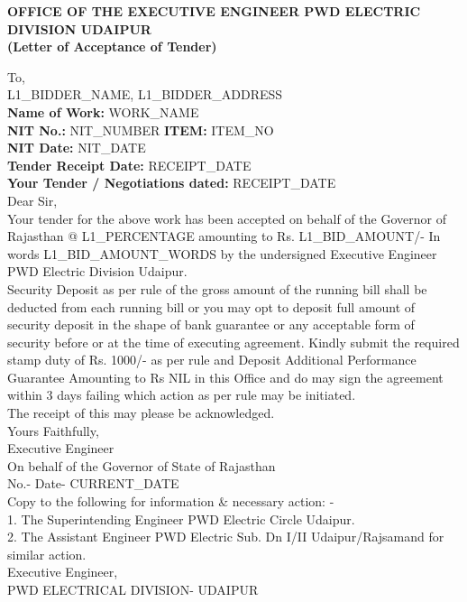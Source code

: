\documentclass[a4paper]{article}
\begin{document}
\begin{center}
    \textbf{OFFICE OF THE EXECUTIVE ENGINEER PWD ELECTRIC DIVISION UDAIPUR} \\
    \vspace{0.5cm}
    \textbf{(Letter of Acceptance of Tender)}
\end{center}

To, \\
{L1_BIDDER_NAME}, {L1_BIDDER_ADDRESS} \\

\vspace{0.5cm}
\textbf{Name of Work:} {WORK_NAME} \\
\textbf{NIT No.:} {NIT_NUMBER} \quad \textbf{ITEM:} {ITEM_NO} \\
\textbf{NIT Date:} {NIT_DATE} \\
\textbf{Tender Receipt Date:} {RECEIPT_DATE} \\
\textbf{Your Tender / Negotiations dated:} {RECEIPT_DATE} \\

Dear Sir, \\

Your tender for the above work has been accepted on behalf of the Governor of Rajasthan @ {L1_PERCENTAGE} amounting to Rs. {L1_BID_AMOUNT}/- In words {L1_BID_AMOUNT_WORDS} by the undersigned Executive Engineer PWD Electric Division Udaipur. \\

Security Deposit as per rule of the gross amount of the running bill shall be deducted from each running bill or you may opt to deposit full amount of security deposit in the shape of bank guarantee or any acceptable form of security before or at the time of executing agreement. Kindly submit the required stamp duty of Rs. 1000/- as per rule and Deposit Additional Performance Guarantee Amounting to Rs NIL in this Office and do may sign the agreement within 3 days failing which action as per rule may be initiated. \\
The receipt of this may please be acknowledged. \\

Yours Faithfully, \\
\vspace{0.5cm}
Executive Engineer \\
On behalf of the Governor of State of Rajasthan \\

No.- \hfill Date- {CURRENT_DATE} \\
Copy to the following for information \& necessary action: - \\
1. The Superintending Engineer PWD Electric Circle Udaipur. \\
2. The Assistant Engineer PWD Electric Sub. Dn I/II Udaipur/Rajsamand for similar action. \\

Executive Engineer, \\
PWD ELECTRICAL DIVISION- UDAIPUR
\end{document}
